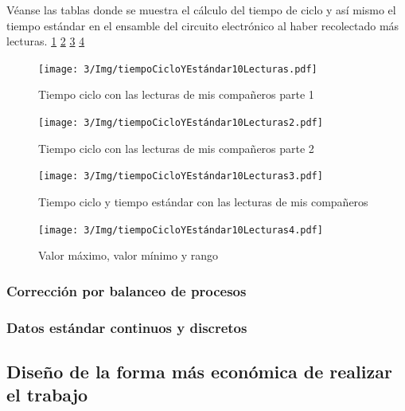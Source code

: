     Véanse las tablas donde se muestra el cálculo del tiempo de ciclo y así mismo el tiempo estándar en el ensamble del circuito electrónico al haber recolectado más lecturas. \ref{fig:tiempoCicloYEstándar10Lecturas} \ref{fig:tiempoCicloYEstándar10Lecturas2} \ref{fig:tiempoCicloYEstándar10Lecturas3} \ref{fig:tiempoCicloYEstándar10Lecturas4}
    \begin{figure}[H]
        \centering
        \texttt{[image: 3/Img/tiempoCicloYEstándar10Lecturas.pdf]}
        \caption{Tiempo ciclo con las lecturas de mis compañeros parte 1} 
        \label{fig:tiempoCicloYEstándar10Lecturas}
    \end{figure}
    \begin{figure}[H]
        \centering
        \texttt{[image: 3/Img/tiempoCicloYEstándar10Lecturas2.pdf]}
        \caption{Tiempo ciclo con las lecturas de mis compañeros parte 2} 
        \label{fig:tiempoCicloYEstándar10Lecturas2}
    \end{figure}
    \begin{figure}[H]
        \centering
        \texttt{[image: 3/Img/tiempoCicloYEstándar10Lecturas3.pdf]}
        \caption{Tiempo ciclo y tiempo estándar con las lecturas de mis compañeros} 
        \label{fig:tiempoCicloYEstándar10Lecturas3}
    \end{figure}
    \begin{figure}[H]
        \centering
        \texttt{[image: 3/Img/tiempoCicloYEstándar10Lecturas4.pdf]}
        \caption{Valor máximo, valor mínimo y rango} 
        \label{fig:tiempoCicloYEstándar10Lecturas4}
    \end{figure}
    \subsubsection{Corrección por balanceo de procesos}
    \subsubsection{Datos estándar continuos y discretos}
    \subsection{Diseño de la forma más económica de realizar el trabajo}
    
